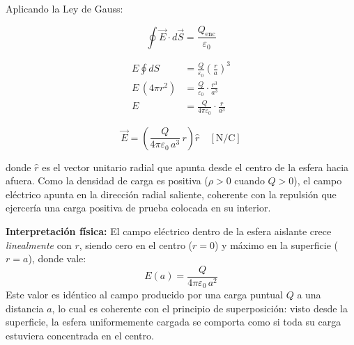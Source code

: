 \documentclass[12pt,letterpaper]{article}
\begin{document}
\bigskip

Aplicando la Ley de Gauss:

\[
    \oint \vec{E}\cdot d\vec{S} = \frac{Q_\text{enc}}{\varepsilon_0}
\]

\begin{align*}
    E \oint dS
        &= \frac{Q}{\varepsilon_0}\left(\frac{r}{a}\right)^3 \\[8pt]
    E\,(4\pi r^2)
        &= \frac{Q}{\varepsilon_0} \cdot \frac{r^3}{a^3} \\[8pt]
    E
        &= \frac{Q}{4\pi\varepsilon_0} \cdot \frac{r}{a^3}
\end{align*}

\[
    \boxed{\vec{E} = \left(\frac{Q}{4\pi\varepsilon_0\,a^3}\,r\right)\hat{r} \quad [\text{N/C}]}
\]

\smallskip
\noindent donde $\hat{r}$ es el vector unitario radial que apunta desde el centro de la
esfera hacia afuera. Como la densidad de carga es positiva ($\rho > 0$ cuando $Q > 0$),
el campo el\'ectrico apunta en la direcci\'on radial saliente, coherente con la
repulsi\'on que ejercer\'ia una carga positiva de prueba colocada en su interior.

\bigskip

\textbf{Interpretaci\'on f\'isica:} El campo el\'ectrico dentro de la esfera aislante
crece \textit{linealmente} con $r$, siendo cero en el centro ($r = 0$) y m\'aximo en
la superficie ($r = a$), donde vale:
\[
    E(a) = \frac{Q}{4\pi\varepsilon_0\,a^2}
\]
Este valor es id\'entico al campo producido por una carga puntual $Q$ a una distancia
$a$, lo cual es coherente con el principio de superposici\'on: visto desde la
superficie, la esfera uniformemente cargada se comporta como si toda su carga estuviera
concentrada en el centro.
\end{document}
